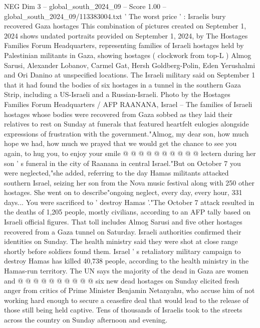 \begin{textsample}{NEG Dim 3 – global\_south\_2024\_09 – Score 1.00 – global\_south\_2024\_09/113383004.txt}  \label{ex:f3_neg_138}
' The worst price ' : Israelis bury recovered Gaza hostages This combination of pictures created on September 1, 2024 shows undated portraits provided on September 1, 2024, by The Hostages Families Forum Headquarters, representing families of Israeli hostages held by Palestinian militants in Gaza, showing hostages ( clockwork from top-L ) Almog Sarusi, Alexander Lobanov, Carmel Gat, Hersh Goldberg-Polin, Eden Yerushalmi and Ori Danino at unspecified locations.
The Israeli military said on September 1 that it had found the bodies of six hostages in a tunnel in the southern Gaza Strip, including a US-Israeli and a Russian-Israeli.
Photo by the Hostages Families Forum Headquarters / AFP RAANANA, Israel -- The families of Israeli hostages whose bodies were recovered from Gaza sobbed as they laid their relatives to rest on Sunday at funerals that featured heartfelt eulogies alongside expressions of frustration with the government."Almog, my dear son, how much hope we had, how much we prayed that we would get the chance to see you again, to hug you, to enjoy your smile @ @ @ @ @ @ @ @ @ @ lectern during her son ' s funeral in the city of Raanana in central Israel."But on October 7 you were neglected,"she added, referring to the day Hamas militants attacked southern Israel, seizing her son from the Nova music festival along with 250 other hostages.
She went on to describe"ongoing neglect, every day, every hour, 331 days...
You were sacrificed to ' destroy Hamas '."The October 7 attack resulted in the deaths of 1,205 people, mostly civilians, according to an AFP tally based on Israeli official figures.
That toll includes Almog Sarusi and five other hostages recovered from a Gaza tunnel on Saturday.
Israeli authorities confirmed their identities on Sunday.
The health ministry said they were shot at close range shortly before soldiers found them.
Israel ' s retaliatory military campaign to destroy Hamas has killed 40,738 people, according to the health ministry in the Hamas-run territory.
The UN says the majority of the dead in Gaza are women and @ @ @ @ @ @ @ @ @ @ six new dead hostages on Sunday elicited fresh anger from critics of Prime Minister Benjamin Netanyahu, who accuse him of not working hard enough to secure a ceasefire deal that would lead to the release of those still being held captive.
Tens of thousands of Israelis took to the streets across the country on Sunday afternoon and evening.

\end{textsample}
